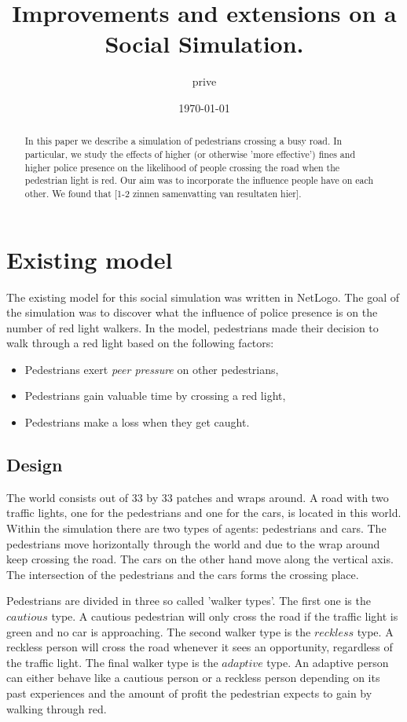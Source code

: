 \documentclass[a4paper]{article}
\title{Improvements and extensions on a Social Simulation.}
\author{prive}
\date{\today}
\begin{document}
\maketitle

\begin{abstract}
	In this paper we describe a simulation of pedestrians crossing a busy road. In particular, we study the effects of higher (or otherwise 'more effective') fines and higher police presence on the likelihood of people crossing the road when the pedestrian light is red. Our aim was to incorporate the influence people have on each other. We found that [1-2 zinnen samenvatting van resultaten hier].
\end{abstract}

\clearpage
\tableofcontents
\clearpage

\section{Existing model}
The existing model for this social simulation was written in NetLogo. The goal of the simulation was to discover what the influence of police presence is on the number of red light walkers. In the model, pedestrians made their decision to walk through a red light based on the following factors:
\begin{itemize}
\item Pedestrians exert \textit{peer pressure} on other pedestrians,
\item Pedestrians gain valuable time by crossing a red light,
\item Pedestrians make a loss when they get caught.
\end{itemize}

\subsection{Design}
The world consists out of 33 by 33 patches and wraps around. A road with two traffic lights, one for the pedestrians and one for the cars, is located in this world. Within the simulation there are two types of agents: pedestrians and cars. The pedestrians move horizontally through the world and due to the wrap around keep crossing the road. The cars on the other hand move along the vertical axis. The intersection of the pedestrians and the cars forms the crossing place.

Pedestrians are divided in three so called 'walker types'. The first one is the $cautious$ type. A cautious pedestrian will only cross the road if the traffic light is green and no car is approaching. The second walker type is the $reckless$ type. A reckless person will cross the road whenever it sees an opportunity, regardless of the traffic light. The final walker type is the $adaptive$ type. An adaptive person can either behave like a cautious person or a reckless person depending on its past experiences and the amount of profit the pedestrian expects to gain by walking through red.
\end{document}
